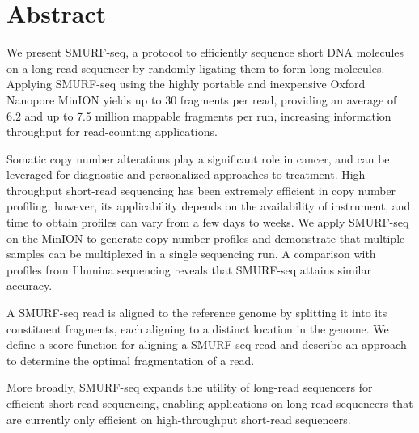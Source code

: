 \chapter*{Abstract}
We present SMURF-seq, a protocol to efficiently sequence short DNA
molecules on a long-read sequencer by randomly ligating them to form
long molecules.
%
Applying SMURF-seq using the highly portable and inexpensive Oxford
Nanopore MinION yields up to 30 fragments per read, providing an average
of 6.2 and up to 7.5 million mappable fragments per run, increasing
information throughput for read-counting applications.

Somatic copy number alterations play a significant role in cancer, and
can be leveraged for diagnostic and personalized approaches to
treatment.
High-throughput short-read sequencing has been extremely efficient in
copy number profiling; however, its applicability depends on the
availability of instrument, and time to obtain profiles can vary from a
few days to weeks.
We apply SMURF-seq on the MinION to generate copy number profiles and
demonstrate that multiple samples can be multiplexed in a single
sequencing run.  A comparison with profiles from Illumina sequencing
reveals that SMURF-seq attains similar accuracy.

A SMURF-seq read is aligned to the reference genome by splitting it into
its constituent fragments, each aligning to a distinct location in the
genome.
We define a score function for aligning a SMURF-seq read and describe an
approach to determine the optimal fragmentation of a read.

More broadly, SMURF-seq expands the utility of long-read sequencers for
efficient short-read sequencing, enabling applications on long-read
sequencers that are currently only efficient on high-throughput
short-read sequencers.
